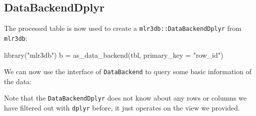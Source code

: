 \documentclass[
  11pt,
  parskip=half,
  DIV=calc,
  BCOR=10mm,
  x11names]{scrbook}
\newenvironment{Shaded}{}{}
\newcommand{\DataTypeTok}[1]{#1}
\newcommand{\KeywordTok}[1]{\textcolor[rgb]{0.00,0.00,1.00}{#1}}
\newcommand{\NormalTok}[1]{#1}
\newcommand{\OperatorTok}[1]{#1}
\newcommand{\StringTok}[1]{\textcolor[rgb]{0.00,0.50,0.50}{#1}}
\begin{document}
\hypertarget{databackenddplyr}{%
\subsection{DataBackendDplyr}\label{databackenddplyr}}

The processed table is now used to create a \texttt{mlr3db::DataBackendDplyr} from \texttt{mlr3db}:

\begin{Shaded}
\begin{Highlighting}[]
\KeywordTok{library}\NormalTok{(}\StringTok{"mlr3db"}\NormalTok{)}
\NormalTok{b =}\StringTok{ }\KeywordTok{as_data_backend}\NormalTok{(tbl, }\DataTypeTok{primary_key =} \StringTok{"row_id"}\NormalTok{)}
\end{Highlighting}
\end{Shaded}

We can now use the interface of \texttt{DataBackend} to query some basic information of the data:

\begin{Shaded}
\end{Shaded}

Note that the \texttt{DataBackendDplyr} does not know about any rows or columns we have filtered out with \texttt{dplyr} before, it just operates on the view we provided.
\end{document}
